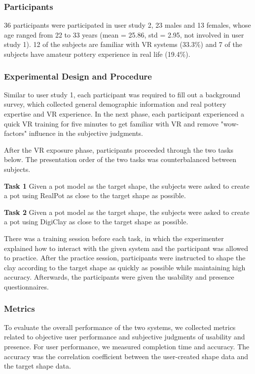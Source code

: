 \documentclass{svjour3}                     %
\begin{document}
{\subsubsection{Participants}
36 participants were participated in user study 2, 23 males and 13 females, whose age ranged from 22 to 33 years (mean = 25.86, std = 2.95, not involved in user study 1). 12 of the subjects are familiar with VR systems (33.3\%) and 7 of the subjects have amateur pottery experience in real life (19.4\%).


\subsubsection{Experimental Design and Procedure}

Similar to user study 1, each participant was required to fill out a background survey, which collected general demographic information and real pottery expertise and VR experience.
In the next phase, each participant experienced a quick VR training for five minutes to get familiar with VR and remove "wow-factors" influence in the subjective judgments.

After the VR exposure phase, participants proceeded through the two tasks below. The presentation order of the two tasks was counterbalanced between subjects.

\textbf{Task 1} Given a pot model as the target shape, the subjects were asked to create a pot using RealPot as close to the target shape as possible.

\textbf{Task 2} Given a pot model as the target shape, the subjects were asked to create a pot using DigiClay as close to the target shape as possible.

There was a training session before each task, in which the experimenter explained how to interact with the given system and the participant was allowed to practice. After the practice session, participants were instructed to shape the clay according to the target shape as quickly as possible while maintaining high accuracy. Afterwards, the participants were given the usability and presence questionnaires.


\subsubsection{Metrics}
To evaluate the overall performance of the two systems, we collected metrics related to objective user performance and subjective judgments of usability and presence.
For user performance, we measured completion time and accuracy.
The accuracy was the correlation coefficient between the user-created shape data and the target shape data.

}
\end{document}
